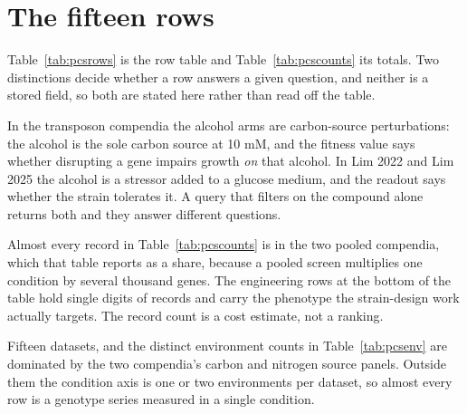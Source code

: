 
\section{The fifteen rows}\label{sec:candidates}

Table~\ref{tab:pcsrows} is the row table and Table~\ref{tab:pcscounts} its totals. Two
distinctions decide whether a row answers a given question, and neither is a stored
field, so both are stated here rather than read off the table.

 In the transposon compendia the alcohol arms are
carbon-source perturbations: the alcohol is the sole carbon source at 10 mM, and the
fitness value says whether disrupting a gene impairs growth \emph{on} that alcohol. In
Lim 2022 and Lim 2025 the alcohol is a stressor added to a glucose medium, and the
readout says whether the strain tolerates it. A query that filters on the compound
alone returns both and they answer different questions.

 Almost every record in
Table~\ref{tab:pcscounts} is in the two pooled compendia, which that table reports as
a share, because a pooled screen multiplies one condition by several thousand genes. The engineering rows at the bottom of the table hold single
digits of records and carry the phenotype the strain-design work actually targets. The
record count is a cost estimate, not a ranking.

 Fifteen datasets, and the distinct
environment counts in Table~\ref{tab:pcsenv} are dominated by the two compendia's
carbon and nitrogen source panels. Outside them the condition axis is one or two
environments per dataset, so almost every row is a genotype series measured in a single
condition.

\clearpage



